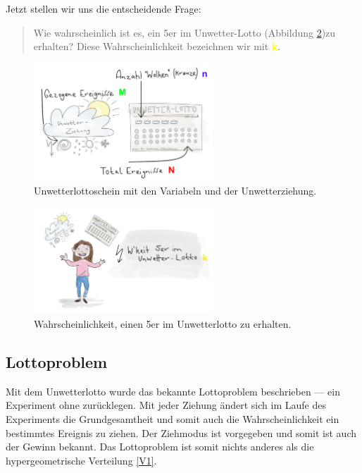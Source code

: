 \begin{refsection}
Jetzt stellen wir uns die entscheidende Frage: 
\begin{quote}
Wie wahrscheinlich ist es, ein 5er im Unwetter-Lotto (Abbildung \ref{WahrscheinlichkeitUnwetterlotto})zu erhalten? Diese Wahrscheinlichkeit bezeichnen wir mit \textcolor{yellow}{\textbf{k}}.
\end{quote}

\begin{figure}
\centering
\includegraphics[width=0.6\textwidth]{extrem/Lottoscheinausgefuellt.pdf}
\caption{Unwetterlottoschein mit den Variabeln und der Unwetterziehung.}
\label{ErklaerungLotto}
\end{figure}

\begin{figure}
\centering
\includegraphics[width=0.6\textwidth]{extrem/wkeitlotto.pdf}
\caption{Wahrscheinlichkeit, einen 5er im Unwetterlotto zu erhalten.}
\label{WahrscheinlichkeitUnwetterlotto}
\end{figure}


\subsection{Lottoproblem} \label{Lottoproblem}
Mit dem Unwetterlotto wurde das bekannte Lottoproblem beschrieben --- ein Experiment ohne zurücklegen. Mit jeder Ziehung ändert sich im Laufe des Experiments die Grundgesamtheit und somit auch die Wahrscheinlichkeit ein bestimmtes Ereignis zu ziehen. Der Ziehmodus ist vorgegeben und somit ist auch der Gewinn bekannt. Das Lottoproblem ist somit nichts anderes als die hypergeometrische Verteilung \eqref{V1}.


\end{refsection}
